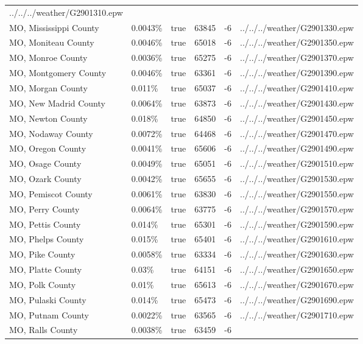 \begin{longtable}[]{@{}llllll@{}}
../../../weather/G2901310.epw \\
MO, Mississippi County & 0.0043\% & true & 63845 & -6 &
../../../weather/G2901330.epw \\
MO, Moniteau County & 0.0046\% & true & 65018 & -6 &
../../../weather/G2901350.epw \\
MO, Monroe County & 0.0036\% & true & 65275 & -6 &
../../../weather/G2901370.epw \\
MO, Montgomery County & 0.0046\% & true & 63361 & -6 &
../../../weather/G2901390.epw \\
MO, Morgan County & 0.011\% & true & 65037 & -6 &
../../../weather/G2901410.epw \\
MO, New Madrid County & 0.0064\% & true & 63873 & -6 &
../../../weather/G2901430.epw \\
MO, Newton County & 0.018\% & true & 64850 & -6 &
../../../weather/G2901450.epw \\
MO, Nodaway County & 0.0072\% & true & 64468 & -6 &
../../../weather/G2901470.epw \\
MO, Oregon County & 0.0041\% & true & 65606 & -6 &
../../../weather/G2901490.epw \\
MO, Osage County & 0.0049\% & true & 65051 & -6 &
../../../weather/G2901510.epw \\
MO, Ozark County & 0.0042\% & true & 65655 & -6 &
../../../weather/G2901530.epw \\
MO, Pemiscot County & 0.0061\% & true & 63830 & -6 &
../../../weather/G2901550.epw \\
MO, Perry County & 0.0064\% & true & 63775 & -6 &
../../../weather/G2901570.epw \\
MO, Pettis County & 0.014\% & true & 65301 & -6 &
../../../weather/G2901590.epw \\
MO, Phelps County & 0.015\% & true & 65401 & -6 &
../../../weather/G2901610.epw \\
MO, Pike County & 0.0058\% & true & 63334 & -6 &
../../../weather/G2901630.epw \\
MO, Platte County & 0.03\% & true & 64151 & -6 &
../../../weather/G2901650.epw \\
MO, Polk County & 0.01\% & true & 65613 & -6 &
../../../weather/G2901670.epw \\
MO, Pulaski County & 0.014\% & true & 65473 & -6 &
../../../weather/G2901690.epw \\
MO, Putnam County & 0.0022\% & true & 63565 & -6 &
../../../weather/G2901710.epw \\
MO, Ralls County & 0.0038\% & true & 63459 & -6 &

\end{longtable}
